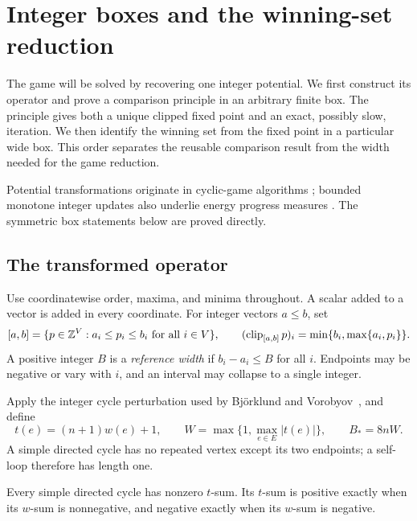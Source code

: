 \section{Integer boxes and the winning-set reduction}
\label{sec:boxes}

The game will be solved by recovering one integer potential. We first
construct its operator and prove a comparison principle in an arbitrary
finite box. The principle gives both a unique clipped fixed point and an
exact, possibly slow, iteration. We then identify the winning set from the
fixed point in a particular wide box. This order separates the reusable
comparison result from the width needed for the game reduction.

Potential transformations originate in cyclic-game algorithms
\cite{GurvichKarzanovKhachiyan1988}; bounded monotone integer updates also
underlie energy progress measures
\cite[Definitions~1--2 and Lemmas~4--6]{BrimEtAl2011}.
The symmetric box statements below are proved directly.

\subsection{The transformed operator}

Use coordinatewise order, maxima, and minima throughout. A scalar added to
a vector is added in every coordinate. For integer vectors $a\le b$, set
\[
 [a,b]=\{p\in\mathbb Z^V:a_i\le p_i\le b_i\text{ for all }i\in V\},
 \qquad
 (\operatorname{clip}_{[a,b]}p)_i=\min\{b_i,\max\{a_i,p_i\}\}.
\]
A positive integer $B$ is a \emph{reference width} if $b_i-a_i\le B$ for
all $i$. Endpoints may be negative or vary with $i$, and an interval may
collapse to a single integer.

Apply the integer cycle perturbation used by Bj\"orklund and
Vorobyov~\cite[Section~9]{BjorklundVorobyov2007}, and define
\begin{equation}
 t(e)=(n+1)w(e)+1,\qquad
 W=\max\bigl\{1,\max_{e\in E}|t(e)|\bigr\},\qquad B_*=8nW.
 \label{eq:transformed}
\end{equation}
A simple directed cycle has no repeated vertex except its two endpoints;
a self-loop therefore has length one.

\begin{lemma}\label{box:cycle-signs}
Every simple directed cycle has nonzero $t$-sum. Its $t$-sum is positive
exactly when its $w$-sum is nonnegative, and negative exactly when its
$w$-sum is negative.
\end{lemma}

